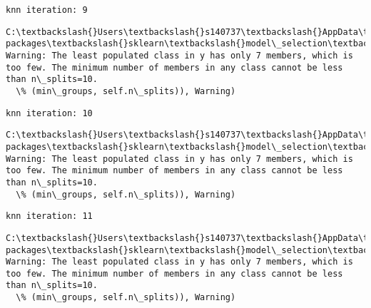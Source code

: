 \documentclass[11pt]{article}
\begin{document}
    \begin{Verbatim}[commandchars=\\\{\}]
knn iteration: 9 

    \end{Verbatim}

    \begin{Verbatim}[commandchars=\\\{\}]
C:\textbackslash{}Users\textbackslash{}s140737\textbackslash{}AppData\textbackslash{}Local\textbackslash{}Continuum\textbackslash{}anaconda3\textbackslash{}lib\textbackslash{}site-packages\textbackslash{}sklearn\textbackslash{}model\_selection\textbackslash{}\_split.py:605: Warning: The least populated class in y has only 7 members, which is too few. The minimum number of members in any class cannot be less than n\_splits=10.
  \% (min\_groups, self.n\_splits)), Warning)

    \end{Verbatim}

    \begin{Verbatim}[commandchars=\\\{\}]
knn iteration: 10 

    \end{Verbatim}

    \begin{Verbatim}[commandchars=\\\{\}]
C:\textbackslash{}Users\textbackslash{}s140737\textbackslash{}AppData\textbackslash{}Local\textbackslash{}Continuum\textbackslash{}anaconda3\textbackslash{}lib\textbackslash{}site-packages\textbackslash{}sklearn\textbackslash{}model\_selection\textbackslash{}\_split.py:605: Warning: The least populated class in y has only 7 members, which is too few. The minimum number of members in any class cannot be less than n\_splits=10.
  \% (min\_groups, self.n\_splits)), Warning)

    \end{Verbatim}

    \begin{Verbatim}[commandchars=\\\{\}]
knn iteration: 11 

    \end{Verbatim}

    \begin{Verbatim}[commandchars=\\\{\}]
C:\textbackslash{}Users\textbackslash{}s140737\textbackslash{}AppData\textbackslash{}Local\textbackslash{}Continuum\textbackslash{}anaconda3\textbackslash{}lib\textbackslash{}site-packages\textbackslash{}sklearn\textbackslash{}model\_selection\textbackslash{}\_split.py:605: Warning: The least populated class in y has only 7 members, which is too few. The minimum number of members in any class cannot be less than n\_splits=10.
  \% (min\_groups, self.n\_splits)), Warning)

    \end{Verbatim}
\end{document}

